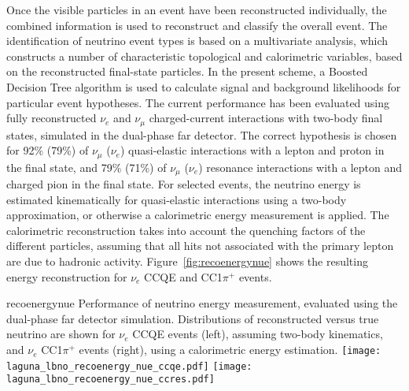 Once the visible particles in an event have been reconstructed
individually, the combined information is used to reconstruct and
classify the overall event.  The identification of neutrino event
types is based on a multivariate
analysis\cite{Back:2013cva,WA105_TDR,LAGUNA-LBNO-deliv,LAGUNA-LBNO-EOI},
which constructs a number of characteristic topological and
calorimetric variables, based on the reconstructed final-state
particles. In the present scheme, a Boosted Decision Tree algorithm is
used to calculate signal and background likelihoods for particular
event hypotheses. The current performance has been evaluated using
fully reconstructed $\nu_{e}$ and $\nu_{\mu}$ charged-current
interactions with two-body final states, simulated in the dual-phase
far detector\cite{LAGUNA-LBNO-deliv}.  The correct hypothesis is
chosen for 92\% (79\%) of $\nu_{\mu}$ ($\nu_{e}$) quasi-elastic
interactions with a lepton and proton in the final state, and 79\%
(71\%) of $\nu_{\mu}$ ($\nu_{e}$) resonance interactions with a lepton
and charged pion in the final state.  For selected events, the
neutrino energy is estimated kinematically for quasi-elastic
interactions using a two-body approximation, or otherwise a
calorimetric energy measurement is applied.  The calorimetric
reconstruction takes into account the quenching factors of the
different particles, assuming that all hits not associated with the
primary lepton are due to hadronic activity.
Figure~\ref{fig:recoenergynue} shows the resulting energy
reconstruction for $\nu_e$ CCQE and CC1$\pi^{+}$ events.
\begin{cdrfigure}{recoenergynue}
{Performance of neutrino energy measurement, evaluated using the dual-phase far detector simulation. 
Distributions of reconstructed versus true neutrino are shown for $\nu_{e}$ CCQE events (left),
assuming two-body kinematics, and $\nu_{e}$  CC1$\pi^{+}$ events (right),
using a calorimetric energy estimation.}
\texttt{[image: laguna\_lbno\_recoenergy\_nue\_ccqe.pdf]}
\texttt{[image: laguna\_lbno\_recoenergy\_nue\_ccres.pdf]}
\end{cdrfigure}

